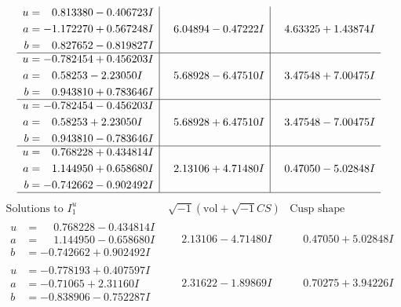 \documentclass[1p]{elsarticle_modified}
\theoremstyle{definition}
\newcommand{\I}{\sqrt{-1}}
\begin{document}
$$\begin{array}{c|c|c}
\begin{aligned}
u &= \phantom{-}0.813380 - 0.406723 I \\
a &= -1.172270 + 0.567248 I \\
b &= \phantom{-}0.827652 - 0.819827 I\end{aligned}
 & \phantom{-}6.04894 - 0.47222 I & \phantom{-}4.63325 + 1.43874 I \\ \hline\begin{aligned}
u &= -0.782454 + 0.456203 I \\
a &= \phantom{-}0.58253 - 2.23050 I \\
b &= \phantom{-}0.943810 + 0.783646 I\end{aligned}
 & \phantom{-}5.68928 - 6.47510 I & \phantom{-}3.47548 + 7.00475 I \\ \hline\begin{aligned}
u &= -0.782454 - 0.456203 I \\
a &= \phantom{-}0.58253 + 2.23050 I \\
b &= \phantom{-}0.943810 - 0.783646 I\end{aligned}
 & \phantom{-}5.68928 + 6.47510 I & \phantom{-}3.47548 - 7.00475 I \\ \hline\begin{aligned}
u &= \phantom{-}0.768228 + 0.434814 I \\
a &= \phantom{-}1.144950 + 0.658680 I \\
b &= -0.742662 - 0.902492 I\end{aligned}
 & \phantom{-}2.13106 + 4.71480 I & \phantom{-}0.47050 - 5.02848 I\\
 \hline 
 \end{array}$$\newpage$$\begin{array}{c|c|c}  
\text{Solutions to }I^u_{1}& \I (\text{vol} + \sqrt{-1}CS) & \text{Cusp shape}\\
 \hline 
\begin{aligned}
u &= \phantom{-}0.768228 - 0.434814 I \\
a &= \phantom{-}1.144950 - 0.658680 I \\
b &= -0.742662 + 0.902492 I\end{aligned}
 & \phantom{-}2.13106 - 4.71480 I & \phantom{-}0.47050 + 5.02848 I \\ \hline\begin{aligned}
u &= -0.778193 + 0.407597 I \\
a &= -0.71065 + 2.31160 I \\
b &= -0.838906 - 0.752287 I\end{aligned}
 & \phantom{-}2.31622 - 1.89869 I & \phantom{-}0.70275 + 3.94226 I \\ \hline\begin{aligned}

\end{aligned}
\end{array}$$
\end{document}
